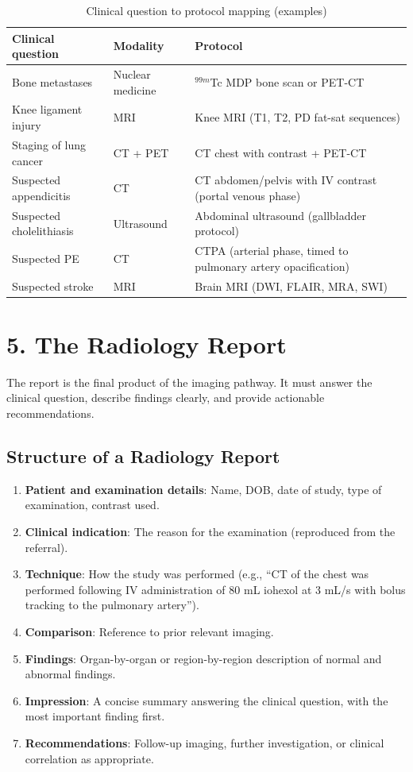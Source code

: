 \begin{table}[h]
\centering
\caption{Clinical question to protocol mapping (examples)}
\begin{tabular}{|p{}|p{}|p{}|}
\hline
\textbf{Clinical question} & \textbf{Modality} & \textbf{Protocol} \\
\hline
Bone metastases & Nuclear medicine & $^{99m}$Tc MDP bone scan or PET-CT \\
\hline
Knee ligament injury & MRI & Knee MRI (T1, T2, PD fat-sat sequences) \\
\hline
Staging of lung cancer & CT + PET & CT chest with contrast + PET-CT \\
\hline
Suspected appendicitis & CT & CT abdomen/pelvis with IV contrast (portal venous phase) \\
\hline
Suspected cholelithiasis & Ultrasound & Abdominal ultrasound (gallbladder protocol) \\
\hline
Suspected PE & CT & CTPA (arterial phase, timed to pulmonary artery opacification) \\
\hline
Suspected stroke & MRI & Brain MRI (DWI, FLAIR, MRA, SWI) \\
\hline
\end{tabular}
\end{table}


\section*{5. The Radiology Report}
The report is the final product of the imaging pathway. It must answer the clinical question, describe findings clearly, and provide actionable recommendations.

\subsection*{Structure of a Radiology Report}
\begin{enumerate}
    \item \textbf{Patient and examination details}: Name, DOB, date of study, type of examination, contrast used.
    \item \textbf{Clinical indication}: The reason for the examination (reproduced from the referral).
    \item \textbf{Technique}: How the study was performed (e.g., ``CT of the chest was performed following IV administration of 80 mL iohexol at 3 mL/s with bolus tracking to the pulmonary artery'').
    \item \textbf{Comparison}: Reference to prior relevant imaging.
    \item \textbf{Findings}: Organ-by-organ or region-by-region description of normal and abnormal findings.
    \item \textbf{Impression}: A concise summary answering the clinical question, with the most important finding first.
    \item \textbf{Recommendations}: Follow-up imaging, further investigation, or clinical correlation as appropriate.
\end{enumerate}

